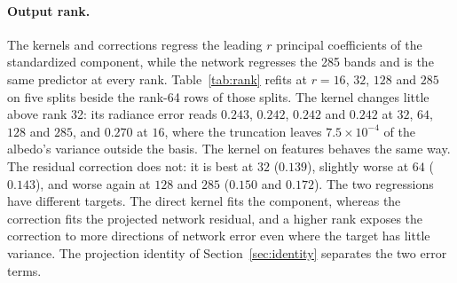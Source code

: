\documentclass[11pt]{article}
\newcommand{\1}{\mathbf{1}}
\begin{document}
\paragraph{Output rank.} The kernels and corrections regress the leading $r$ principal
coefficients of the standardized component, while the network regresses the 285 bands and is the
same predictor at every rank. Table~\ref{tab:rank} refits at $r = 16$, $32$, $128$ and $285$ on
five splits beside the rank-64 rows of those splits. The kernel changes little above rank 32:
its radiance error reads $0.243$, $0.242$, $0.242$ and $0.242$ at $32$, $64$, $128$ and $285$,
and $0.270$ at $16$, where the truncation leaves $7.5\times10^{-4}$ of the albedo's variance
outside the basis. The kernel on features behaves the same way. The residual correction does
not: it is best at $32$ ($0.139$), slightly worse at $64$ ($0.143$), and worse again at $128$ and
$285$ ($0.150$ and $0.172$). The two regressions have different targets. The direct kernel fits
the component, whereas the correction fits the projected network residual, and a higher rank
exposes the correction to more directions of network error even where the target has little
variance. The projection identity of Section~\ref{sec:identity} separates the two error terms.

\begin{table}[t]
\centering\small
\resizebox{\textwidth}{!}{}
\caption{The pipeline of Section~\ref{sec:methods} with a $3\times2000$ network in place of the
$3\times512$ one, on the same ten splits: the network (one member, up to 500 epochs under the same
optimizer, learning rate and early stopping), its residual correction, the exact kernel on its
last-layer features, and the per-coordinate selection and convex stack over the wide pipeline's
four distinct predictors (the isotropic kernel, network, correction and feature kernel; with a
single network the ensemble slots repeat the network), beside the corresponding rows of
Table~\ref{tab:results}; mean $\pm$ standard deviation over the ten splits.}
\label{tab:wide}
\end{table}
\end{document}
